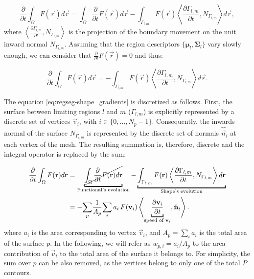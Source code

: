   \begin{equation}
  \frac{\partial}{\partial t} \int_\Omega F(\vec{r}) d\vec{r} =
  \int_\Omega \frac{\partial}{\partial t}F(\vec{r}) d\vec{r}
  - \int_{\Gamma_{l,m}} F(\vec{r}) \left\langle \frac{\partial \Gamma_{l,m} }{\partial t},
  N_{\Gamma_{l,m}}\right\rangle d\vec{r},
  \end{equation}
%
  where $\left\langle\frac{\partial\Gamma_{l,m}}{\partial t}, N_{\Gamma_{l,m}}\right\rangle$ is
  the projection of the boundary movement on the unit inward normal $N_{\Gamma_{l,m}}$.
Assuming that the region descriptors $\{\boldsymbol{\mu}_l, \boldsymbol{\Sigma}_l\}$ vary slowly enough, we can consider
  that $\frac{\partial}{\partial t} F(\vec{r}) = 0$ and thus:

  \begin{equation}
  \frac{\partial}{\partial t} \int_\Omega F(\vec{r}) d\vec{r} =
  - \int_{\Gamma_{l,m}} F(\vec{r}) \left\langle \frac{\partial \Gamma_{l,m} }{\partial t},
  N_{\Gamma_{l,m}}\right\rangle d\vec{r}.
  \label{eq:regseg-shape_gradients}
  \end{equation}

The equation \eqref{eq:regseg-shape_gradients} is discretized as follows.
First, the surface between limiting regions $l$ and $m$ ($\Gamma_{l,m}$) is explicitly represented by
  a discrete set of vertices $\vec{v}_i$, with $i \in \{0, \ldots, N_p -1 \}$.
Consequently, the inwards normal of the surface $N_{\Gamma_{l,m}}$ is represented by the discrete
  set of normals $\hat{\vec{n}}_i$ at each vertex of the mesh.
The resulting summation is, therefore, discrete and the integral operator is replaced by the sum:

  \begin{align}
  \frac{\partial}{\partial t} \int_\Omega F(\vec{r}) d\vec{r} &=
  \underbracket{\cancel{\int_\Omega \frac{\partial}{\partial t}F(\vec{r}) d\vec{r} }}_{\text{Functional's evolution}}
  - \underbracket{\int_{\Gamma_{l,m}} F(\vec{r}) \left\langle \frac{\partial \Gamma_{l,m}}{\partial t},
  N_{\Gamma_{l,m}}\right\rangle d\vec{r}}_{\text{Shape's evolution}} \notag \\
  & = - \underset{p}{\sum} \frac{1}{A_p} \underset{i}{\sum} \, a_i \, F(\vec{v}_i) \left\langle \underbracket{\frac{\partial \vec{v}_i}{\partial t}}_{\text{speed of }\vec{v}_i},
  \hat{\vec{n}}_{i}\right\rangle.
  \label{eq:regseg-shape_gradient_orig}
  \end{align}
where $a_i$ is the area corresponding to vertex $\vec{v}_i$, and $A_p = \sum_i a_i$ is the total area of the surface $p$.
In the following, we will refer as $w_{p,i} = a_i / A_p $ to the area contribution of $\vec{v}_i$ to the
  total area of the surface it belongs to.
For simplicity, the sum over $p$ can be also removed, as the vertices belong to only one of the total $P$ contours.

